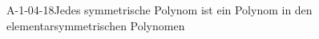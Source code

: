 
\begin{PROP}{A-1-04-18}{Jedes symmetrische Polynom ist ein Polynom in den elementarsymmetrischen Polynomen}
\end{PROP}
